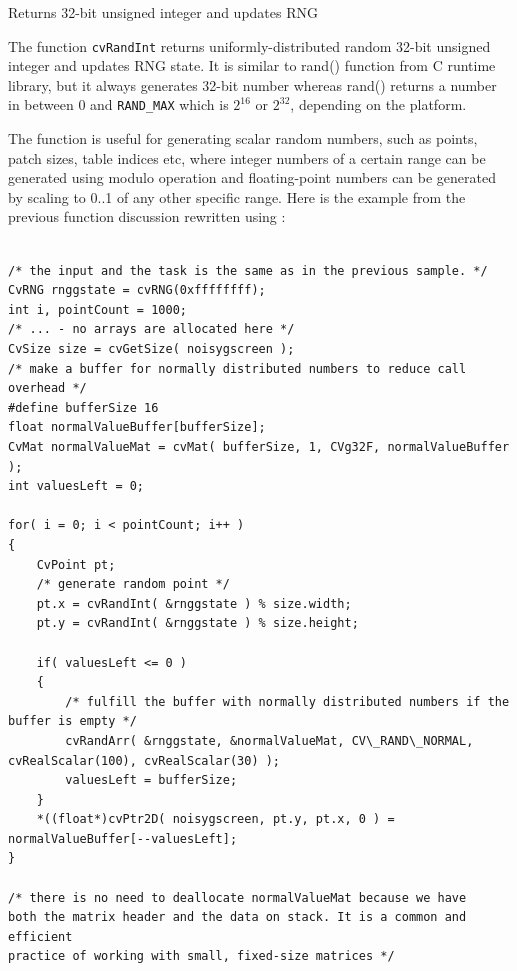 \label{RandInt}

Returns 32-bit unsigned integer and updates RNG


\begin{description}
\end{description}

The function \texttt{cvRandInt} returns uniformly-distributed random
32-bit unsigned integer and updates RNG state. It is similar to rand()
function from C runtime library, but it always generates 32-bit number
whereas rand() returns a number in between 0 and \texttt{RAND\_MAX}
which is $2^{16}$ or $2^{32}$, depending on the platform.

The function is useful for generating scalar random numbers, such as
points, patch sizes, table indices etc, where integer numbers of a certain
range can be generated using modulo operation and floating-point numbers
can be generated by scaling to 0..1 of any other specific range. Here
is the example from the previous function discussion rewritten using
:

\begin{lstlisting}

/* the input and the task is the same as in the previous sample. */
CvRNG rnggstate = cvRNG(0xffffffff);
int i, pointCount = 1000;
/* ... - no arrays are allocated here */
CvSize size = cvGetSize( noisygscreen );
/* make a buffer for normally distributed numbers to reduce call overhead */
#define bufferSize 16
float normalValueBuffer[bufferSize];
CvMat normalValueMat = cvMat( bufferSize, 1, CVg32F, normalValueBuffer );
int valuesLeft = 0;

for( i = 0; i < pointCount; i++ )
{
    CvPoint pt;
    /* generate random point */
    pt.x = cvRandInt( &rnggstate ) % size.width;
    pt.y = cvRandInt( &rnggstate ) % size.height;

    if( valuesLeft <= 0 )
    {
        /* fulfill the buffer with normally distributed numbers if the buffer is empty */
        cvRandArr( &rnggstate, &normalValueMat, CV\_RAND\_NORMAL, cvRealScalar(100), cvRealScalar(30) );
        valuesLeft = bufferSize;
    }
    *((float*)cvPtr2D( noisygscreen, pt.y, pt.x, 0 ) = normalValueBuffer[--valuesLeft];
}

/* there is no need to deallocate normalValueMat because we have
both the matrix header and the data on stack. It is a common and efficient
practice of working with small, fixed-size matrices */

\end{lstlisting}

